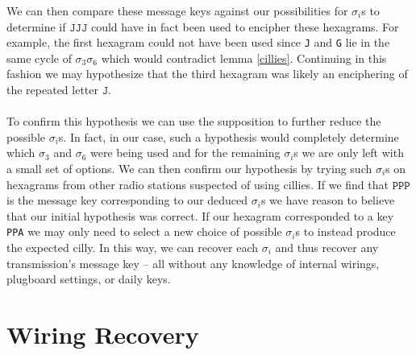 We can then compare these message keys against our possibilities for
$\sigma_i$s to determine if $\texttt{JJJ}$ could have in fact been
used to encipher these hexagrams. For example, the first hexagram
could not have been used since \texttt{J} and \texttt{G} lie in the
same cycle of $\sigma_3\sigma_6$ which would contradict lemma
\ref{cillies}. Continuing in this fashion we may hypothesize that the
third hexagram was likely an enciphering of the repeated letter $\texttt{J}$.
\\\\To confirm this hypothesis we can use the supposition to further
reduce the possible $\sigma_i$s. In fact, in our case, such a
hypothesis would completely determine which $\sigma_3$ and $\sigma_6$
were being used and for the remaining $\sigma_i$s we are only left
with a small set of options. We can then confirm our hypothesis by
trying such $\sigma_i$s on hexagrams from other radio stations
suspected of using cillies. If we find that $\texttt{PPP}$ is the
message key corresponding to our deduced $\sigma_i$s we have reason
to believe that our initial hypothesis was correct. If our hexagram
corresponded to a key \texttt{PPA} we may only need to select a new
choice of possible $\sigma_i$s to instead produce the expected cilly.
In this way, we can recover each $\sigma_i$ and thus recover any
transmission's message key -- all without any knowledge of internal
wirings, plugboard settings, or daily keys.
\section{Wiring Recovery}

